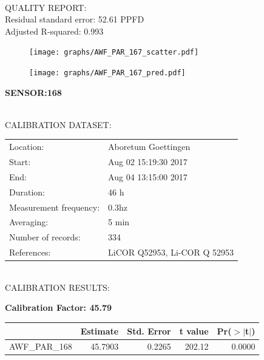 \documentclass[oneside]{report}
\begin{document}
\hrulefill\\
QUALITY REPORT:\\
Residual standard error: 52.61 PPFD\\
Adjusted R-squared: 0.993



\begin{figure}[H]
  \centering
  \texttt{[image: graphs/AWF\_PAR\_167\_scatter.pdf]}
\end{figure}




\begin{figure}[H]
  \centering
  \texttt{[image: graphs/AWF\_PAR\_167\_pred.pdf]}
\end{figure}

\pagebreak


\begin{center}
\large{\textbf{SENSOR:168}}\\
\end{center}

\hrulefill\\
CALIBRATION DATASET:\\
\begin{table}[h!]
  \centering
  \label{tab:table1}
  \begin{tabular}{ll}
    Location: & Aboretum Goettingen\\ 
    
    
    Start:  & Aug 02 15:19:30 2017 \\
    End:   & Aug 04 13:15:00 2017\\ 
    Duration: & 46 h\\
    Measurement frequency: & 0.3hz\\
    Averaging:  &5 min\\
    Number of records: & 334 \\
    References: & LiCOR Q52953, Li-COR Q 52953 \\
  \end{tabular}
\end{table}

\hrulefill\\
CALIBRATION RESULTS:\\


\begin{center}
\textbf{\large{Calibration Factor: 45.79}}\\
\end{center}
\begin{table}[ht]
\centering
\begin{tabular}{rrrrr}
  \hline
 & Estimate & Std. Error & t value & Pr($>$$|$t$|$) \\ 
  \hline
AWF\_PAR\_168 & 45.7903 & 0.2265 & 202.12 & 0.0000 \\ 
   \hline
\end{tabular}
\end{table}
\end{document}
